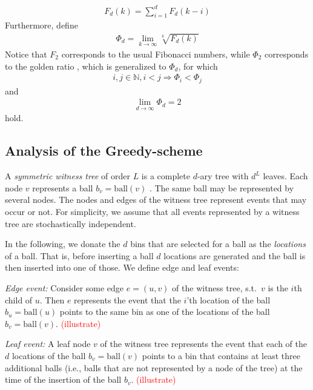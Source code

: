 \documentclass[a4paper,12pt]{article}
\newcommand\todo[1]{\textcolor{red}{(#1)}}
\begin{document}
\begin{align}
F_d(k) = \sum_{i=1}^{d}F_d(k-i)
\end{align}
Furthermore, define 
\begin{align}
\Phi_d = \lim_{k \rightarrow \infty} \sqrt[k]{F_d(k)}
\end{align}
Notice that $F_2$ corresponds to the usual Fibonacci numbers, while $\Phi_2 $ corresponds to the golden ratio \cite{Knuth73}, which is generalized to $\Phi_d$, for which 
\begin{align}
i, j \in \mathbb{N}, i < j \Rightarrow \Phi_i < \Phi_j
\end{align}
and 
\begin{align}
\lim_{d\rightarrow \infty} \Phi_d = 2
\end{align}
hold.

\subsection{Analysis of the Greedy-scheme}
\label{sec:analysis:greedy}
A \emph{symmetric witness tree} of order $L$ is a complete $d$-ary tree with $d^{L}$ leaves. Each node $v$ represents a ball $b_v = \mathrm{ball}(v)$ . The same ball may be represented by several nodes. The nodes and edges of the witness tree represent events that may occur or not. For simplicity, we assume that all events represented by a witness tree are stochastically independent.  

In the following, we donate the $d$ bins that are selected for a ball as the \emph{locations} of a ball. That is, before inserting a ball $d$ locations are generated and the ball is then inserted into one of those. We define edge and leaf events:
\begin{compactitem}
\item \emph{Edge event:} Consider some edge $e = (u,v)$ of the witness tree, s.t.~$v$ is the $i$th child of $u$. Then $e$ represents the event that the $i$'th location of the ball $b_u = \mathrm{ball}(u)$ points to the same bin as one of the locations of the ball $b_v = \mathrm{ball}(v)$. 
\todo{illustrate}
\item \emph{Leaf event:} A leaf node $v$ of the witness tree represents the event that each of the $d$ locations of the ball $b_v = \mathrm{ball}(v)$ points to a bin that contains at least three additional balls (i.e., balls that are not represented by a node of the tree) at the time of the insertion of the ball $b_v$.
\todo{illustrate}
\end{compactitem}
\end{document}
